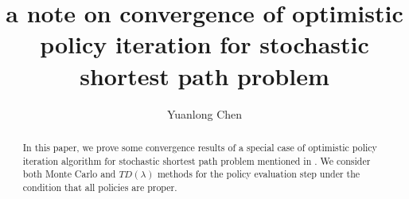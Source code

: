 \documentclass[12pt,a4paper]{amsart}
\numberwithin{equation}{section}
\theoremstyle{plain}
\theoremstyle{definition}
\begin{document}
\title[Convergence for stochastic shortest path]{a note on convergence of optimistic policy iteration for stochastic shortest path problem}


\author[Y. Chen]{Yuanlong Chen}

\address{Department of Mathematics, University of Washington, Seattle, WA, United States} 





















\begin{abstract}  
	In this paper, we prove some convergence results of a special case of optimistic policy iteration algorithm for stochastic shortest path problem mentioned in \cite{Ts03} . We consider both Monte Carlo  and $TD(\lambda)$ methods for the policy evaluation step under the condition that all policies are proper. 
\end{abstract}

\maketitle

\end{document}
